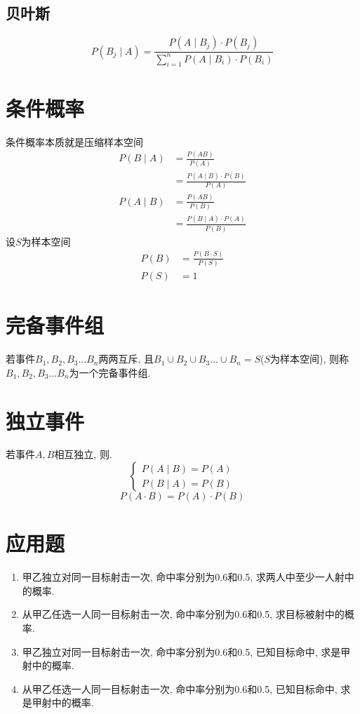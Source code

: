 \documentclass[a4paper]{report}
\begin{document}
\subsection{贝叶斯}
$$P(B_j\mid A)=\frac{P(A\mid B_j)\cdot P(B_j)}{\sum_{i=1}^n P(A\mid B_i)\cdot P(B_i)}$$
\section{条件概率}
条件概率本质就是压缩样本空间
\begin{align*}
  P(B\mid A)&=\frac{P(AB)}{P(A)}\\
  &=\frac{P(A\mid B)\cdot P(B)}{P(A)}\\
  P(A\mid B)&=\frac{P(AB)}{P(B)}\\
  &=\frac{P(B\mid A)\cdot P(A)}{P(B)}
\end{align*}
设$S$为样本空间
\begin{align*}
  P(B)&=\frac{P(B\cdot S)}{P(S)}\\
  P(S)&=1
\end{align*}
\section{完备事件组}
若事件$B_1,B_2,B_3\dots B_n$两两互斥, 且$B_1\cup B_2\cup B_3\dots \cup B_n=S$($S$为样本空间), 则称$B_1,B_2,B_3\dots B_n$为一个完备事件组. 
\section{独立事件}
若事件$A, B$相互独立, 则. 
$$\begin{cases}
  P(A\mid B)=P(A)\\
  P(B\mid A)=P(B)
\end{cases}
$$
$$P(A\cdot B)=P(A)\cdot P(B)$$
\section{应用题}
\begin{enumerate}
  \item 甲乙独立对同一目标射击一次, 命中率分别为0.6和0.5, 求两人中至少一人射中的概率. 
  \item 从甲乙任选一人同一目标射击一次, 命中率分别为0.6和0.5, 求目标被射中的概率. 
  \item 甲乙独立对同一目标射击一次, 命中率分别为0.6和0.5, 已知目标命中, 求是甲射中的概率. 
  \item 从甲乙任选一人同一目标射击一次, 命中率分别为0.6和0.5, 已知目标命中, 求是甲射中的概率. 
\end{enumerate}
\end{document}
